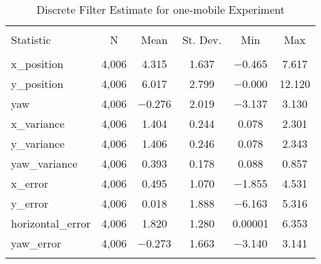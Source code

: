
\begin{table}[h] \centering 
  \caption{Discrete Filter Estimate for one-mobile Experiment} 
  \label{tab:one_mobile_discrete_summary} 
\begin{tabular}{@{\extracolsep{5pt}}lccccc} 
\\[-1.8ex]\hline 
\hline \\[-1.8ex] 
Statistic & \multicolumn{1}{c}{N} & \multicolumn{1}{c}{Mean} & \multicolumn{1}{c}{St. Dev.} & \multicolumn{1}{c}{Min} & \multicolumn{1}{c}{Max} \\ 
\hline \\[-1.8ex] 
x\_position & 4,006 & 4.315 & 1.637 & $-$0.465 & 7.617 \\ 
y\_position & 4,006 & 6.017 & 2.799 & $-$0.000 & 12.120 \\ 
yaw & 4,006 & $-$0.276 & 2.019 & $-$3.137 & 3.130 \\ 
x\_variance & 4,006 & 1.404 & 0.244 & 0.078 & 2.301 \\ 
y\_variance & 4,006 & 1.406 & 0.246 & 0.078 & 2.343 \\ 
yaw\_variance & 4,006 & 0.393 & 0.178 & 0.088 & 0.857 \\ 
x\_error & 4,006 & 0.495 & 1.070 & $-$1.855 & 4.531 \\ 
y\_error & 4,006 & 0.018 & 1.888 & $-$6.163 & 5.316 \\ 
horizontal\_error & 4,006 & 1.820 & 1.280 & 0.00001 & 6.353 \\ 
yaw\_error & 4,006 & $-$0.273 & 1.663 & $-$3.140 & 3.141 \\ 
\hline \\[-1.8ex] 
\end{tabular} 
\end{table} 
